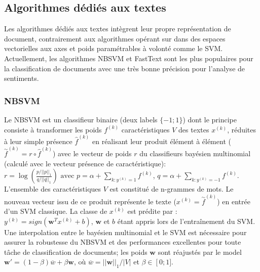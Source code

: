 

\subsection{Algorithmes dédiés aux textes}
Les algorithmes dédiés aux textes intègrent leur propre représentation de document, contrairement aux algorithmes opérant sur dans des espaces vectorielles aux axes et poids paramétrables à volonté comme le SVM.  Actuellement, les algorithmes NBSVM \citep{wang2012nbsvm} et FastText \citep{grave2017fasttextcls} sont les plus populaires pour la classification de documents avec une très bonne précision pour l'analyse de sentiments. 


\subsubsection{NBSVM}

Le NBSVM \citep{wang2012nbsvm} est un classifieur binaire (deux labels $\lbrace -1; 1 \rbrace$) dont le principe consiste à transformer les poids $f^{(k)}$ caractéristiques $V$ des textes $x^{(k)}$, réduites à leur simple présence $\widehat{f}^{(k)}$ en réalisant leur produit élément à élément ($\overset{\sim}{f}^{(k)} = {r} \circ \widehat{f}^{(k)}$) avec le vecteur de poids $r$ du classifieurs bayésien multinomial (calculé avec le vecteur présence de caractéristique):
$r = \log \left( \frac{p/\vert\vert p \vert\vert_1}{q / \vert\vert q \vert\vert_1}\right)
\text{ avec } p=\alpha + \sum\limits_{k:y^{(k)}=1}{f}^{(k)}$, $q=\alpha + \sum\limits_{k:y^{(k)}=-1}{f}^{(k)}$. L'ensemble des caractéristiques $V$ est constitué de n-grammes de mots. Le nouveau vecteur issu de ce produit représente le texte ($x^{(k)} = \overset{\sim}{f}^{(k)}$) en entrée d'un SVM classique. La classe de $x^{(k)}$ est prédite par : $y^{(k)} = sign(\mathbf{w}^Tx^{(k)} + b)$, $\mathbf{w}$ et $b$ étant appris lors de l'entraînement du SVM. Une interpolation  entre le bayésien multinomial et le SVM est nécessaire pour assurer la robustesse du NBSVM et des performances excellentes pour toute tâche de classification de documents; les poids $\mathbf{w}$ sont réajustés par le model $\mathbf{w'} = (1 - \beta) \overline{w} + \beta \mathbf{w}$, où $\overline{w} = \vert\vert \mathbf{w}\vert\vert_1 / \vert V \vert$ et $\beta \in \left[0; 1] \right.$. 
  

